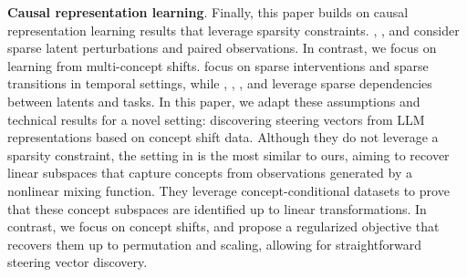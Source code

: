 \textbf{Causal representation learning}. Finally, this paper builds on causal representation learning results that leverage sparsity constraints. \citet{ahuja2022weakly}, \citet{locatello2020weakly}, and \citet{brehmer2022weaklysupervisedcausalrepresentation} consider sparse latent perturbations and paired observations. In contrast, we focus on learning from multi-concept shifts. \citet{lachapelle2022disentanglement} focus on sparse interventions and sparse transitions in temporal settings, while \citet{lachapelle2023synergies}, \citet{layne2024sparsityregularizationtreestructuredenvironments}, \citet{xu2024sparsityprinciplepartiallyobservable}, and \citet{fumero2023leveragingsparsesharedfeature} leverage sparse dependencies between latents and tasks. In this paper, we adapt these assumptions and technical results for a novel setting: discovering steering vectors from LLM representations based on concept shift data. Although they do not leverage a sparsity constraint, the setting in \citet{rajendran2024learning} is the most similar to ours, aiming to recover linear subspaces that capture concepts from observations generated by a nonlinear mixing function. They leverage concept-conditional datasets to prove that these concept subspaces are identified up to linear transformations. In contrast, we focus on concept shifts, and propose a regularized objective that recovers them up to permutation and scaling, allowing for straightforward steering vector discovery. 




